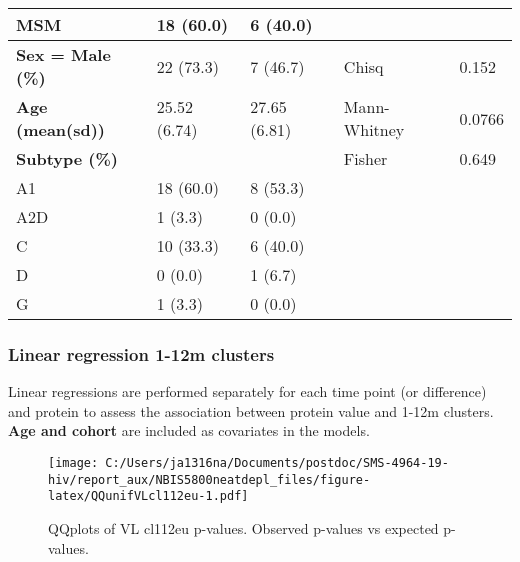 \documentclass[
]{article}
\begin{document}
\begin{table}
\begin{tabular}[t]{l|l|l|l|l}
\hline
MSM & 18 (60.0) & 6 (40.0) &  & \\
\hline
\textbf{Sex = Male (\%)} & 22 (73.3) & 7 (46.7) & Chisq & 0.152\\
\hline
\textbf{Age (mean(sd))} & 25.52 (6.74) & 27.65 (6.81) & Mann-Whitney & 0.0766\\
\hline
\textbf{Subtype (\%)} &  &  & Fisher & 0.649\\
\hline
A1 & 18 (60.0) & 8 (53.3) &  & \\
\hline
A2D & 1 (3.3) & 0 (0.0) &  & \\
\hline
C & 10 (33.3) & 6 (40.0) &  & \\
\hline
D & 0 (0.0) & 1 (6.7) &  & \\
\hline
G & 1 (3.3) & 0 (0.0) &  & \\
\hline
\end{tabular}
\end{table}

\FloatBarrier

\hypertarget{linear-regression-1-12m-clusters}{%
\subsubsection{Linear regression 1-12m clusters}\label{linear-regression-1-12m-clusters}}

Linear regressions are performed separately for each time point (or difference) and protein to assess the association between protein value and 1-12m clusters. \textbf{Age and cohort} are included as covariates in the models.

\FloatBarrier

\begin{figure}
\centering
\texttt{[image: C:/Users/ja1316na/Documents/postdoc/SMS-4964-19-hiv/report\_aux/NBIS5800neatdepl\_files/figure-latex/QQunifVLcl112eu-1.pdf]}
\caption{\label{fig:QQunifVLcl112eu}QQplots of VL cl112eu p-values. Observed p-values vs expected p-values.}
\end{figure}

\FloatBarrier
\end{document}
